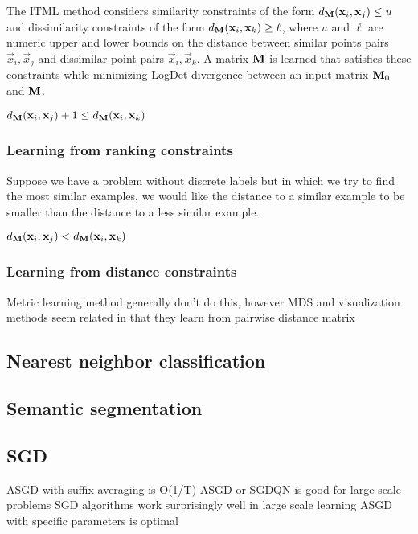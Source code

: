 The \acf{ITML} method \cite{davis2007information} considers similarity constraints of the form $d_{\mathbf{M}}(\mathbf{x}_{i}, \mathbf{x}_{j}) \leq u$ and dissimilarity constraints of the form $d_{\mathbf{M}}(\mathbf{x}_{i}, \mathbf{x}_{k}) \geq \ell$, where $u$ and $\ell$ are numeric upper and lower bounds on the distance between similar points pairs $\vec{x}_{i}, \vec{x}_{j}$ and dissimilar point pairs $\vec{x}_{i}, \vec{x}_{k}$. A matrix $\mathbf{M}$ is learned that satisfies these constraints while minimizing LogDet divergence between an input matrix $\mathbf{M}_0$ and $\mathbf{M}$.


$d_{\mathbf{M}}(\mathbf{x}_{i}, \mathbf{x}_{j}) + 1 \leq d_{\mathbf{M}}(\mathbf{x}_{i}, \mathbf{x}_{k})$
\subsubsection{Learning from ranking constraints}

Suppose we have a problem without discrete labels but in which we try to find the most similar examples, we would like the distance to a similar example to be smaller than the distance to a less similar example.

$d_{\mathbf{M}}(\mathbf{x}_{i}, \mathbf{x}_{j}) < d_{\mathbf{M}}(\mathbf{x}_{i}, \mathbf{x}_{k})$

\subsubsection{Learning from distance constraints}

Metric learning method generally don't do this, however MDS and visualization methods seem related in that they learn from pairwise distance matrix

\subsection{Nearest neighbor classification}

\subsection{Semantic segmentation}



\subsection{SGD}
 \cite{rakhlin2012making} ASGD with suffix averaging is O(1/T) \cite{bottou2010large} ASGD or SGDQN is good for large scale problems \cite{bottou2008tradeoffs} SGD algorithms work surprisingly well in large scale learning \cite{xu2011towards} ASGD with specific parameters is optimal



